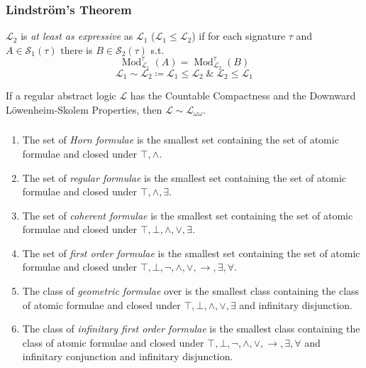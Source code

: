\documentclass[UTF8,11pt,colorlinks,compress,openany]{beamer}%
\begin{document}
\begin{frame}\frametitle{Lindstr\"om's Theorem}
	\begin{definition}
		$\mathcal{L}_2$ is \emph{at least as expressive} as $\mathcal{L}_1$ ($\mathcal{L}_1\leq \mathcal{L}_2$) if for each signature $\tau$ and $A\in \mathcal{S}_1(\tau)$ there is $B\in \mathcal{S}_2(\tau)$ s.t.
		\[\operatorname{Mod}_{\mathcal{L}_1}^\tau(A)=\operatorname{Mod}_{\mathcal{L}_2}^\tau(B)\]
		\[\mathcal{L}_1\sim\mathcal{L}_2\coloneqq \mathcal{L}_1\leq\mathcal{L}_2\;\&\;\mathcal{L}_2\leq\mathcal{L}_1\]
	\end{definition}
	\begin{theorem}
		If a regular abstract logic $\mathcal{L}$ has the Countable Compactness and the Downward L\"owenheim-Skolem Properties, then $\mathcal{L}\sim\mathcal{L}_{\omega\omega}$.
	\end{theorem}
\end{frame}

\begin{frame}\frametitle{\hyperlink{quantifier-adjoint}{}}
\label{fragment-logic}
\begin{enumerate}
	\item The set of \emph{Horn formulae} is the smallest set containing the set of atomic formulae and closed under $\top,\wedge$.
	\item The set of \emph{regular formulae} is the smallest set containing the set of atomic formulae and closed under $\top,\wedge,\exists$.
	\item The set of \emph{coherent formulae} is the smallest set containing the set of atomic formulae and closed under $\top,\bot,\wedge,\vee,\exists$.
	\item The set of \emph{first order formulae} is the smallest set containing the set of atomic formulae and closed under $\top,\bot,\neg,\wedge,\vee,\to,\exists,\forall$.
	\item The class of \emph{geometric formulae} over is the smallest class containing the class of atomic formulae and closed under $\top,\bot,\wedge,\vee,\exists$ and infinitary disjunction.
	\item The class of \emph{infinitary first order formulae} is the smallest class containing the class of atomic formulae and closed under $\top,\bot,\neg,\wedge,\vee,\to,\exists,\forall$ and infinitary conjunction and infinitary disjunction.
\end{enumerate}
\end{frame}
\end{document}
